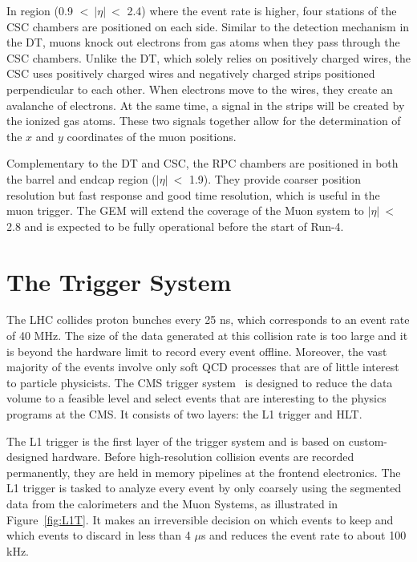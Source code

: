In region (0.9 $<~|\eta|~<$ 2.4) where the event rate is higher, four stations of the \ac{CSC} chambers are positioned on each side. Similar to the detection mechanism in the \ac{DT}, muons knock out electrons from gas atoms when they pass through the \ac{CSC} chambers. Unlike the \ac{DT}, which solely relies on positively charged wires, the \ac{CSC} uses positively charged wires and negatively charged strips positioned perpendicular to each other. When electrons move to the wires, they create an avalanche of electrons. At the same time, a signal in the strips will be created by the ionized gas atoms. These two signals together allow for the determination of the $x$ and $y$ coordinates of the muon positions. 

Complementary to the \ac{DT} and \ac{CSC}, the \ac{RPC} chambers are positioned in both the barrel and endcap region ($|\eta|~<$ 1.9). They provide coarser position resolution but fast response and good time resolution, which is useful in the muon trigger. The \ac{GEM} will extend the coverage of the Muon system to $|\eta|~<$ 2.8 and is expected to be fully operational before the start of Run-4. 

\section{The Trigger System}
\label{sec:TrigSys}
 
The \ac{LHC} collides proton bunches every 25 ns, which corresponds to an event rate of 40 MHz. The size of the data generated at this collision rate is too large and it is beyond the hardware limit to record every event offline. Moreover, the vast majority of the events involve only soft \ac{QCD} processes that are of little interest to particle physicists. The \ac{CMS} trigger system~\cite{CMS:2016ngn} is designed to reduce the data volume to a feasible level and select events that are interesting to the physics programs at the \ac{CMS}. It consists of two layers: the \ac{L1} trigger and \ac{HLT}.

The \ac{L1} trigger is the first layer of the trigger system and is based on custom-designed hardware. Before high-resolution collision events are recorded permanently, they are held in memory pipelines at the frontend electronics. The \ac{L1} trigger is tasked to analyze every event by only coarsely using the segmented data from the calorimeters and the Muon Systems, as illustrated in Figure~\ref{fig:L1T}. It makes an irreversible decision on which events to keep and which events to discard in less than 4 $\mu$s and reduces the event rate to about 100 kHz.

